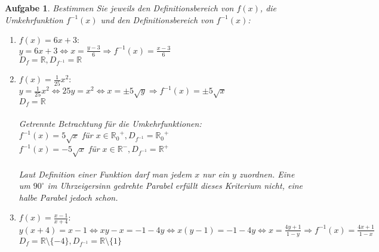 \documentclass[12pt]{article}
\newtheorem{exercise}[satz]{Aufgabe}
\begin{document}
\begin{exercise}
  Bestimmen Sie jeweils den Definitionsbereich von $f(x)$, die Umkehrfunktion $f^{-1}(x)$ und den Definitionsbereich von $f^{-1}(x)$:
  \begin{enumerate}
    \item[(a)] $f(x)=6x+3:$\\ 
         $y=6x+3 \Leftrightarrow x = \frac{y-3}{6} \Rightarrow f^{-1}(x) = \frac{x-3}{6}$\\
         $D_f = \mathbb{R}, D_{f^{-1}} = \mathbb{R}$
    \item[(b)] $f(x)=\frac{1}{25}x^2:$\\ 
         $y=\frac{1}{25}x^2 \Leftrightarrow 25y=x^2 \Leftrightarrow  x = \pm 5\sqrt{y} \Rightarrow f^{-1}(x) = \pm 5\sqrt{x}$\\
         $D_f = \mathbb{R}$\\
         \\
         Getrennte Betrachtung f\"ur die Umkehrfunktionen:\\
         $f^{-1}(x) = 5\sqrt{x}$ f\"ur $x\in {\mathbb{R}_0}^+, D_{f^{-1}} = {\mathbb{R}_0}^+$\\
         $f^{-1}(x) = -5\sqrt{x}$ f\"ur $x\in \mathbb{R}^-, D_{f^{-1}} = \mathbb{R}^+$\\
         \\
         Laut Definition einer Funktion darf man jedem $x$ nur ein $y$ zuordnen. Eine um $90^\circ$ im Uhrzeigersinn gedrehte Parabel erf\"ullt dieses Kriterium nicht, eine halbe Parabel jedoch schon.
    \item[(c)] $f(x)=\frac{x-1}{x+4}:$\\ 
         $y(x+4)=x-1 \Leftrightarrow xy-x=-1-4y \Leftrightarrow  x(y-1) = -1-4y \Leftrightarrow x=\frac{4y+1}{1-y}\Rightarrow f^{-1}(x) = \frac{4x+1}{1-x}$\\
         $D_f = \mathbb{R} \setminus \{-4\}, D_{f^{-1}} = \mathbb{R} \setminus \{1\}$
  \end{enumerate}
\end{exercise}

\vspace{0.1cm}
\end{document}
